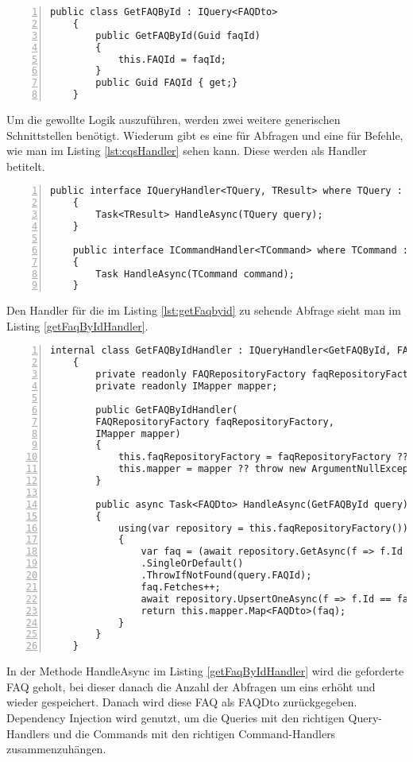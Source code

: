 \newpage

\begin{lstlisting}[caption={CQS-Query Beispiel},captionpos=b, numbers=left, backgroundcolor=\color{black!10},language={[Sharp]C}, label={lst:getFaqbyid}]
	public class GetFAQById : IQuery<FAQDto>
	{
		public GetFAQById(Guid faqId)
		{
			this.FAQId = faqId;
		}
		public Guid FAQId { get;}
	}
\end{lstlisting}
Um die gewollte Logik auszuführen, werden zwei weitere generischen Schnittstellen benötigt. Wiederum gibt es eine für Abfragen und eine für Befehle, wie man im Listing \ref{lst:cqsHandler} sehen kann. Diese werden als Handler betitelt. \autocite{cqsSOLIDeArchitektur}
\begin{lstlisting}[caption={CQS-Handler},captionpos=b, numbers=left, backgroundcolor=\color{black!10},language={[Sharp]C}, label={lst:cqsHandler}]
	public interface IQueryHandler<TQuery, TResult>	where TQuery : IQuery<TResult>
	{
		Task<TResult> HandleAsync(TQuery query);
	}
	
	public interface ICommandHandler<TCommand> where TCommand : ICommand
	{
		Task HandleAsync(TCommand command);
	}
\end{lstlisting}
Den Handler für die im Listing \ref{lst:getFaqbyid} zu sehende Abfrage sieht man im Listing \ref{getFaqByIdHandler}.
\begin{lstlisting}[caption={CQS-Handler Beispiel},captionpos=b, numbers=left, backgroundcolor=\color{black!10},language={[Sharp]C}, label={getFaqByIdHandler}]
	internal class GetFAQByIdHandler : IQueryHandler<GetFAQById, FAQDto>
	{
		private readonly FAQRepositoryFactory faqRepositoryFactory;
		private readonly IMapper mapper;
		
		public GetFAQByIdHandler(
		FAQRepositoryFactory faqRepositoryFactory,
		IMapper mapper)
		{
			this.faqRepositoryFactory = faqRepositoryFactory ?? throw new ArgumentNullException (nameof(faqRepositoryFactory));
			this.mapper = mapper ?? throw new ArgumentNullException(nameof(mapper));
		}
		
		public async Task<FAQDto> HandleAsync(GetFAQById query)
		{
			using(var repository = this.faqRepositoryFactory())
			{
				var faq = (await repository.GetAsync(f => f.Id == query.FAQId))
				.SingleOrDefault()
				.ThrowIfNotFound(query.FAQId);
				faq.Fetches++;
				await repository.UpsertOneAsync(f => f.Id == faq.Id, faq);
				return this.mapper.Map<FAQDto>(faq);
			}
		}
	}
\end{lstlisting}
In der Methode HandleAsync im Listing \ref{getFaqByIdHandler} wird die geforderte FAQ geholt, bei dieser danach die Anzahl der Abfragen um eins erhöht und wieder gespeichert. Danach wird diese FAQ als FAQDto zurückgegeben.\\
Dependency Injection wird genutzt, um die Queries mit den richtigen Query-Handlers und die Commands mit den richtigen Command-Handlers zusammenzuhängen. \autocite{cqsSOLIDeArchitektur}


